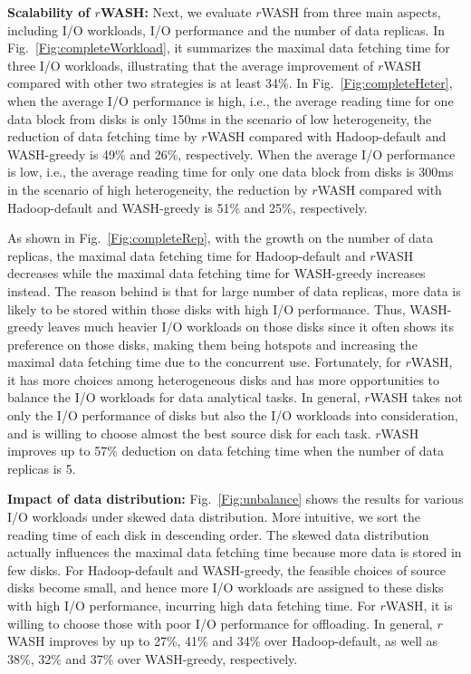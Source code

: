 \documentclass[conference]{IEEEtran}
\begin{document}

\textbf{Scalability of $r$WASH:} Next, we evaluate $r$WASH from three main aspects, including I/O workloads, I/O performance and the number of data replicas. In Fig.~\ref{Fig:completeWorkload}, it summarizes the maximal data fetching time for three I/O workloads, illustrating that the average improvement of $r$WASH compared with other two strategies is at least 34\%. In Fig.~\ref{Fig:completeHeter}, when the average I/O performance is high, i.e., the average reading time for one data block from disks is only 150ms in the scenario of low heterogeneity, the reduction of data fetching time by $r$WASH compared with Hadoop-default and WASH-greedy is 49\% and 26\%, respectively. When the average I/O performance is low, i.e., the average reading time for only one data block from disks is 300ms in the scenario of high heterogeneity, the reduction by $r$WASH compared with Hadoop-default and WASH-greedy is 51\% and 25\%, respectively. 

As shown in Fig.~\ref{Fig:completeRep}, with the growth on the number of data replicas, the maximal data fetching time for Hadoop-default and $r$WASH decreases while the maximal data fetching time for WASH-greedy increases instead. The reason behind is that for large number of data replicas, more data is likely to be stored within those disks with high I/O performance. Thus, WASH-greedy leaves much heavier I/O workloads on those disks since it often shows its preference on those disks, making them being hotspots and increasing the maximal data fetching time due to the concurrent use. Fortunately, for $r$WASH, it has more choices among heterogeneous disks and has more opportunities to balance the I/O workloads for data analytical tasks. In general, $r$WASH takes not only the I/O performance of disks but also the I/O workloads into consideration, and is willing to choose almost the best source disk for each task. $r$WASH improves up to 57\% deduction on data fetching time when the number of data replicas is 5.


 \textbf{Impact of data distribution:} Fig.~\ref{Fig:unbalance} shows the results for various I/O workloads under skewed data distribution. More intuitive, we sort the reading time of each disk in descending order.  The skewed data distribution actually influences the maximal data fetching time because more data is stored in few disks. For Hadoop-default and WASH-greedy, the feasible choices of source disks become small, and hence more I/O workloads are assigned to these disks with high I/O performance, incurring high data fetching time. For $r$WASH, it is willing to choose those with poor I/O performance for offloading. In general, $r$WASH improves by up to 27\%, 41\% and 34\% over Hadoop-default, as well as 38\%, 32\% and 37\% over WASH-greedy, respectively.
\end{document}
